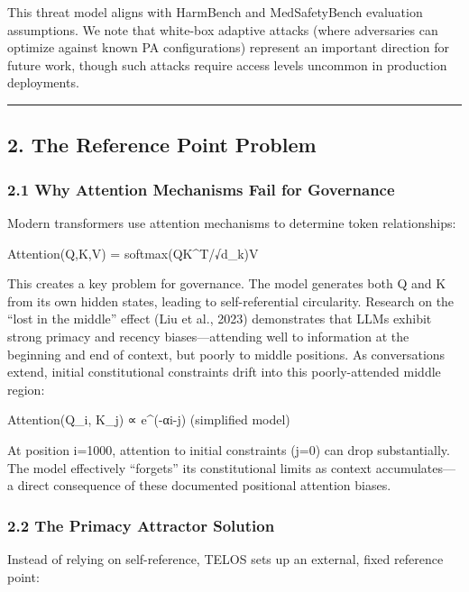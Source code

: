 This threat model aligns with HarmBench and MedSafetyBench evaluation
assumptions. We note that white-box adaptive attacks (where adversaries
can optimize against known PA configurations) represent an important
direction for future work, though such attacks require access levels
uncommon in production deployments.

\begin{center}\rule{0.5\linewidth}{0.5pt}\end{center}

\subsection{2. The Reference Point
Problem}\label{the-reference-point-problem}

\subsubsection{2.1 Why Attention Mechanisms Fail for
Governance}\label{why-attention-mechanisms-fail-for-governance}

Modern transformers use attention mechanisms to determine token
relationships:

Attention(Q,K,V) = softmax(QK\^{}T/√d\_k)V

This creates a key problem for governance. The model generates both Q
and K from its own hidden states, leading to self-referential
circularity. Research on the ``lost in the middle'' effect (Liu et al.,
2023) demonstrates that LLMs exhibit strong primacy and recency
biases---attending well to information at the beginning and end of
context, but poorly to middle positions. As conversations extend,
initial constitutional constraints drift into this poorly-attended
middle region:

Attention(Q\_i, K\_j) ∝ e\^{}(-α\textbar i-j\textbar) (simplified model)

At position i=1000, attention to initial constraints (j=0) can drop
substantially. The model effectively ``forgets'' its constitutional
limits as context accumulates---a direct consequence of these documented
positional attention biases.

\subsubsection{2.2 The Primacy Attractor
Solution}\label{the-primacy-attractor-solution}

Instead of relying on self-reference, TELOS sets up an external, fixed
reference point:


